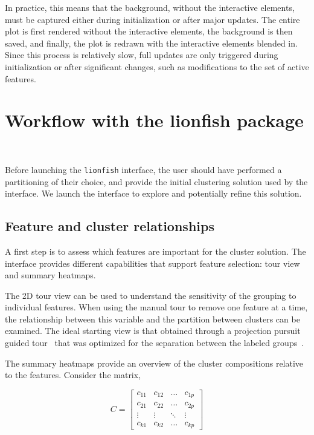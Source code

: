 \documentclass[article]{ajs}
\begin{document}
In practice, this means that the background, without the interactive elements, must be captured either during initialization or after major updates. The entire plot is first rendered without the interactive elements, the background is then saved, and finally, the plot is redrawn with the interactive elements blended in. Since this process is relatively slow, full updates are only triggered during initialization or after significant changes, such as modifications to the set of active features.

\section{Workflow with the lionfish package}~\label{workflow}

Before launching the \texttt{lionfish} interface, the user should have performed a partitioning of their choice, and provide the initial clustering solution used by the interface. We launch the interface to explore and potentially refine this solution.

\subsection{Feature and cluster relationships}

A first step is to assess which features are important for the cluster solution. The interface provides different capabilities that support feature selection: tour view and summary heatmaps. 

The 2D tour view can be used to understand the sensitivity of the grouping to individual features. When using the manual tour to remove one feature at a time, the relationship between this variable and the partition between clusters can be examined. The ideal starting view is that obtained through a projection pursuit guided tour~\citep{CBCH94} that was optimized for the separation between the labeled groups~\citep{lckl2005}.

The summary heatmaps provide an overview of the cluster compositions relative to the features. Consider the matrix,

\[
C = \left[ \begin{array}{cccc} c_{11} & c_{12} & \dots & c_{1p} \\
                                              c_{21} & c_{22} & \dots & c_{2p} \\
                                              \vdots &  \vdots & \ddots &  \vdots \\
                                              c_{k1} & c_{k2} & \dots & c_{kp}
                                              \end{array} \right]
\]
\end{document}
